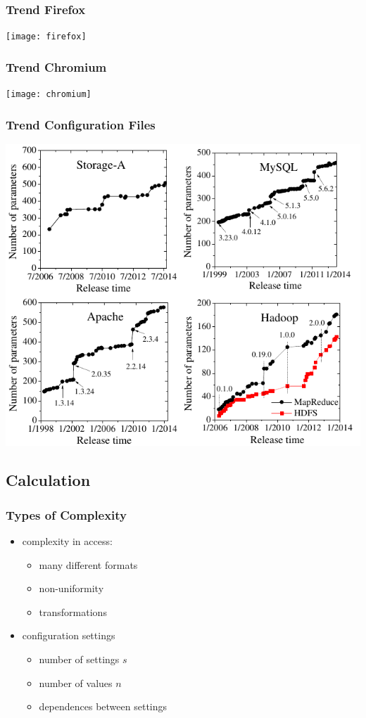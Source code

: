 \begin{frame}
	\frametitle{Trend Firefox}
	\texttt{[image: firefox]}
\end{frame}

\begin{frame}
	\frametitle{Trend Chromium}
	\texttt{[image: chromium]}
\end{frame}

\begin{frame}
	\frametitle{Trend Configuration Files}
	\includegraphics[scale=0.5]{pics/trend.png}
	\citet{xu2015hey}
\end{frame}

\subsection{Calculation}

\begin{frame}
	\frametitle{Types of Complexity}
	\begin{itemize}
	\item complexity in access:
		\begin{itemize}
		\item many different formats
		\item non-uniformity
		\item transformations
		\end{itemize}
	\item configuration settings
		\begin{itemize}
		\item number of settings $s$
		\item number of values $n$
		\item dependences between settings
		\end{itemize}
	\end{itemize}
\end{frame}

